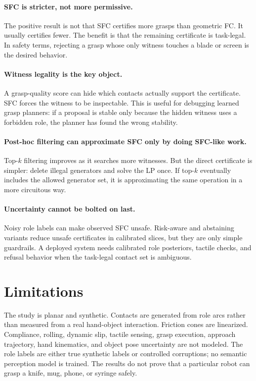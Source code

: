\documentclass{article}
\begin{document}
\paragraph{SFC is stricter, not more permissive.}
The positive result is not that SFC certifies more grasps than geometric FC. It usually certifies fewer. The benefit is that the remaining certificate is task-legal. In safety terms, rejecting a grasp whose only witness touches a blade or screen is the desired behavior.

\paragraph{Witness legality is the key object.}
A grasp-quality score can hide which contacts actually support the certificate. SFC forces the witness to be inspectable. This is useful for debugging learned grasp planners: if a proposal is stable only because the hidden witness uses a forbidden role, the planner has found the wrong stability.

\paragraph{Post-hoc filtering can approximate SFC only by doing SFC-like work.}
Top-\(k\) filtering improves as it searches more witnesses. But the direct certificate is simpler: delete illegal generators and solve the LP once. If top-\(k\) eventually includes the allowed generator set, it is approximating the same operation in a more circuitous way.

\paragraph{Uncertainty cannot be bolted on last.}
Noisy role labels can make observed SFC unsafe. Risk-aware and abstaining variants reduce unsafe certificates in calibrated slices, but they are only simple guardrails. A deployed system needs calibrated role posteriors, tactile checks, and refusal behavior when the task-legal contact set is ambiguous.

\section{Limitations}

The study is planar and synthetic. Contacts are generated from role arcs rather than measured from a real hand-object interaction. Friction cones are linearized. Compliance, rolling, dynamic slip, tactile sensing, grasp execution, approach trajectory, hand kinematics, and object pose uncertainty are not modeled. The role labels are either true synthetic labels or controlled corruptions; no semantic perception model is trained. The results do not prove that a particular robot can grasp a knife, mug, phone, or syringe safely.
\end{document}
